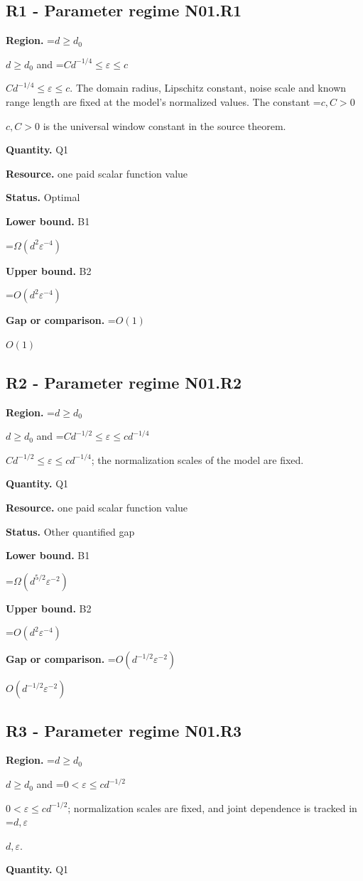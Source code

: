 \documentclass[10pt,a4paper]{article}
\newcommand{\AtlasMath}[1]{\par\begingroup\centering\setbox0=\hbox{$\displaystyle #1$}\ifdim\wd0>1.4\linewidth\typeout{ATLAS WIDE FORMULA: \the\wd0}\fi\ifdim\wd0>\linewidth\resizebox{\linewidth}{!}{\box0}\else\box0\fi\par\endgroup}
\newcommand{\AtlasInlineMath}[1]{\begingroup\setbox0=\hbox{$#1$}\ifdim\wd0>.4\linewidth\endgroup\AtlasMath{#1}\else\endgroup$#1$\fi}
\begin{document}
\subsection{R1 - Parameter regime N01.R1}
\textbf{Region.} \AtlasInlineMath{d\ge d_0} and \AtlasInlineMath{Cd^{-1/4}\le\varepsilon\le c}. The domain radius, Lipschitz constant, noise scale and known range length are fixed at the model's normalized values. The constant \AtlasInlineMath{c,C>0} is the universal window constant in the source theorem.

\textbf{Quantity.} Q1

\textbf{Resource.} one paid scalar function value

\textbf{Status.} Optimal

\textbf{Lower bound.} B1

\AtlasMath{\Omega(d^2\varepsilon^{-4})}
\textbf{Upper bound.} B2

\AtlasMath{O(d^2\varepsilon^{-4})}
\textbf{Gap or comparison.} \AtlasInlineMath{O(1)}

\subsection{R2 - Parameter regime N01.R2}
\textbf{Region.} \AtlasInlineMath{d\ge d_0} and \AtlasInlineMath{Cd^{-1/2}\le\varepsilon\le cd^{-1/4}}; the normalization scales of the model are fixed.

\textbf{Quantity.} Q1

\textbf{Resource.} one paid scalar function value

\textbf{Status.} Other quantified gap

\textbf{Lower bound.} B1

\AtlasMath{\Omega(d^{5/2}\varepsilon^{-2})}
\textbf{Upper bound.} B2

\AtlasMath{O(d^2\varepsilon^{-4})}
\textbf{Gap or comparison.} \AtlasInlineMath{O(d^{-1/2}\varepsilon^{-2})}

\subsection{R3 - Parameter regime N01.R3}
\textbf{Region.} \AtlasInlineMath{d\ge d_0} and \AtlasInlineMath{0<\varepsilon\le cd^{-1/2}}; normalization scales are fixed, and joint dependence is tracked in \AtlasInlineMath{d,\varepsilon}.

\textbf{Quantity.} Q1
\end{document}
